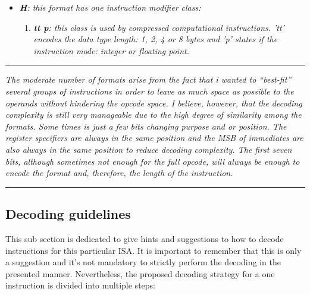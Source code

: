\begin{itemize}
\begin{enumerate}
                    \end{enumerate}

                \item \textit{\textbf{H}: this format has one instruction modifier class:}

                    \begin{enumerate}

                        \item \textit{\textbf{tt p}: this class is used by compressed computational instructions. 'tt' encodes the data type length: 1, 2, 4 or 8 bytes and 'p' states if the instruction mode: integer or floating point.}

                    \end{enumerate}

            \end{itemize}

        \par\noindent\rule{\textwidth}{0.4pt}
        \textit{The moderate number of formats arise from the fact that i wanted to ``best-fit'' several groups of instructions in order to leave as much space as possible to the operands without hindering the opcode space. I believe, however, that the decoding complexity is still very manageable due to the high degree of similarity among the formats. Some times is just a few bits changing purpose and or position. The register specifiers are always in the same position and the MSB of immediates are also always in the same position to reduce decoding complexity. The first seven bits, although sometimes not enough for the full opcode, will always be enough to encode the format and, therefore, the length of the instruction.}
        \par\noindent\rule{\textwidth}{0.4pt}

        \subsection{Decoding guidelines}    %

            \vspace{10pt}

            This sub section is dedicated to give hints and suggestions to how to decode instructions for this particular ISA. It is important to remember that this is only a suggestion and it's not mandatory to strictly perform the decoding in the presented manner. Nevertheless, the proposed decoding strategy for a one instruction is divided into multiple steps:

